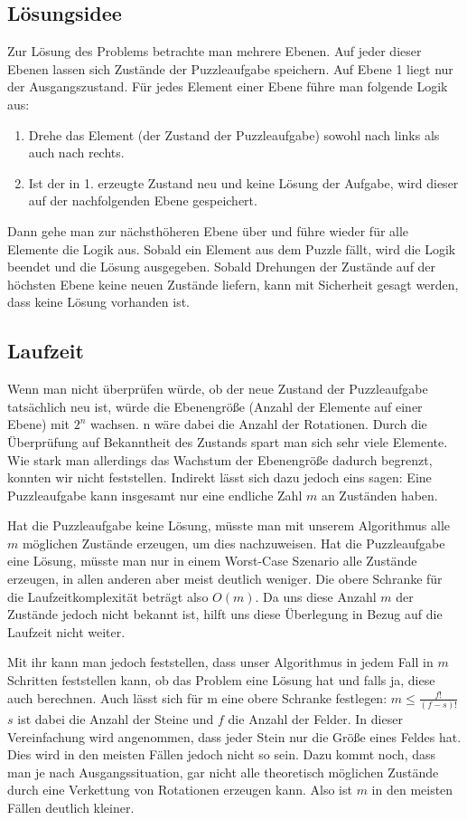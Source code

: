 \subsection {Lösungsidee}
	Zur Lösung des Problems betrachte man mehrere Ebenen. Auf jeder dieser Ebenen lassen sich Zustände der Puzzleaufgabe speichern. 
	Auf Ebene 1 liegt nur der Ausgangszustand. Für jedes Element einer Ebene führe man folgende Logik aus:

	\begin{enumerate}
		\item Drehe das Element (der Zustand der Puzzleaufgabe) sowohl nach links als auch nach rechts.
		\item Ist der in 1. erzeugte Zustand neu und keine Lösung der Aufgabe, wird dieser auf der nachfolgenden Ebene gespeichert.
	\end{enumerate}

	Dann gehe man zur nächsthöheren Ebene über und führe wieder für alle Elemente die Logik aus.
	Sobald ein Element aus dem Puzzle fällt, wird die Logik beendet und die Lösung ausgegeben. Sobald Drehungen der Zustände auf der höchsten Ebene keine neuen Zustände liefern, kann mit Sicherheit gesagt werden, dass keine Lösung vorhanden ist.
	
\subsection{Laufzeit}
	Wenn man nicht überprüfen würde, ob der neue Zustand der Puzzleaufgabe tatsächlich neu ist, würde die Ebenengröße (Anzahl der Elemente auf einer Ebene) mit \(2^n\) wachsen.  
	n wäre dabei die Anzahl der Rotationen. Durch die Überprüfung auf Bekanntheit des Zustands spart man sich sehr viele Elemente. 
	Wie stark man allerdings das Wachstum der Ebenengröße dadurch begrenzt, konnten wir nicht feststellen. Indirekt lässt sich dazu jedoch eins sagen: 
	Eine Puzzleaufgabe kann insgesamt nur eine endliche Zahl \(m\) an Zuständen haben. 

	Hat die Puzzleaufgabe keine Lösung, müsste man mit unserem Algorithmus alle \(m\) möglichen Zustände erzeugen, um dies nachzuweisen.
	Hat die Puzzleaufgabe eine Lösung, müsste man nur in einem Worst-Case Szenario alle  Zustände erzeugen, in allen anderen aber meist deutlich weniger.
	Die obere Schranke für die Laufzeitkomplexität beträgt also \(O(m)\). Da uns diese Anzahl \(m\) der Zustände jedoch nicht bekannt ist, 
	hilft uns diese Überlegung in Bezug auf die Laufzeit nicht weiter. 

	Mit ihr kann man jedoch feststellen, dass unser Algorithmus in jedem Fall in \(m\) Schritten feststellen kann, ob das Problem eine Lösung hat und falls ja, diese auch berechnen. 
	Auch lässt sich für m eine obere Schranke festlegen: \(m \le \frac{f!}{(f-s)!}\) \(s\) ist dabei die Anzahl der Steine und \(f\) die Anzahl der Felder. 
	In dieser Vereinfachung wird angenommen, dass jeder Stein nur die Größe eines Feldes hat. Dies wird in den meisten Fällen jedoch nicht so sein.
	Dazu kommt noch, dass man je nach Ausgangssituation, 
	gar nicht alle theoretisch möglichen Zustände durch eine Verkettung von Rotationen erzeugen kann. 
	Also ist \(m\) in den meisten Fällen deutlich kleiner. 

